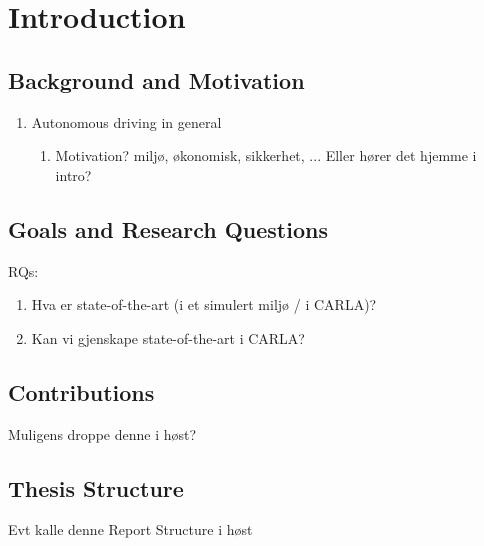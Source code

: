 \chapter{Introduction}

\section{Background and Motivation}

\begin{enumerate}
    \item Autonomous driving in general
    \begin{enumerate}
        \item Motivation? miljø, økonomisk, sikkerhet, ... Eller hører det hjemme i intro?
    \end{enumerate}
\end{enumerate}


\section{Goals and Research Questions}
RQs:
\begin{enumerate}
    \item Hva er state-of-the-art (i et simulert miljø / i CARLA)?
    \item Kan vi gjenskape state-of-the-art i CARLA?
\end{enumerate}


\section{Contributions}
Muligens droppe denne i høst?

\section{Thesis Structure}
Evt kalle denne Report Structure i høst

